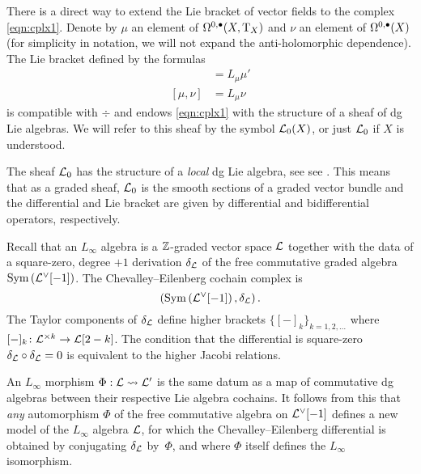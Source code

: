 There is a direct way to extend the Lie bracket of vector fields to the complex \eqref{eqn:cplx1}. 
Denote by $\mu$ an element of $\Omega^{0,\bullet}(X , {\rm T}_X)$ and $\nu$ an element of $\Omega^{0,\bullet}(X)$ (for simplicity in notation, we will not expand the anti-holomorphic dependence). 
The Lie bracket defined by the formulas
\begin{align*}
[\mu, \mu'] & = L_\mu \mu' \\
[\mu, \nu] & = L_\mu \nu 
\end{align*}
is compatible with $\div$ and endows \eqref{eqn:cplx1} with the structure of a sheaf of dg Lie algebras.
We will refer to this sheaf by the symbol $\mathcal L_0(X)$, or just $\mathcal L_0$ if $X$ is understood. 

The sheaf $\mathcal L_0$ has the structure of a {\em local} dg Lie algebra, see see \cite[??]{CG2}.
This means that as a graded sheaf, $\mathcal L_0$ is the smooth sections of a graded vector bundle and the differential and Lie bracket are given by differential and bidifferential operators, respectively.



Recall that an $L_\infty$ algebra is a $\mathbb Z$-graded vector space $\mathcal L$ together with the data of a square-zero, degree $+1$ derivation $\delta_\mathcal L$ of the free commutative graded algebra $\operatorname{Sym}\left(\mathcal L^\vee [-1] \right)$. 
The Chevalley--Eilenberg cochain complex is 
\[
\left(\operatorname{Sym}\left(\mathcal L^\vee [-1] \right), \delta_\mathcal L\right) .
\]
The Taylor components of $\delta_\mathcal L$ define higher brackets $\{[-]_k\}_{k=1,2,\ldots}$ where $[-]_k \colon \mathcal L^{\times k} \to \mathcal L[2-k]$. 
The condition that the differential is square-zero $\delta_\mathcal L \circ \delta_\mathcal L = 0$ is equivalent to the higher Jacobi relations.

An $L_\infty$ morphism $\Phi: \mathcal L \rightsquigarrow \mathcal L'$ is the same datum as a map of commutative dg algebras 
between their respective Lie algebra cochains. It follows from this that \emph{any} automorphism $\Phi$ of the free commutative algebra on $\mathcal L^\vee[-1]$ defines a new model of the $L_\infty$ algebra $\mathcal L$, for which the Chevalley--Eilenberg differential is obtained by conjugating $\delta_\mathcal L$ by~$\Phi$, and where $\Phi$ itself defines the $L_\infty$ isomorphism.

